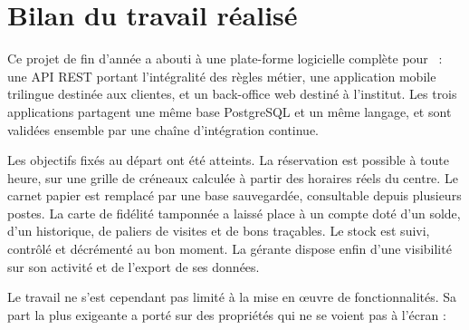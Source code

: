 
\section*{Bilan du travail réalisé}

Ce projet de fin d'année a abouti à une plate-forme logicielle complète pour
\yani\ : une API REST portant l'intégralité des règles métier, une application
mobile trilingue destinée aux clientes, et un back-office web destiné à
l'institut. Les trois applications partagent une même base PostgreSQL et un
même langage, et sont validées ensemble par une chaîne d'intégration continue.

Les objectifs fixés au départ ont été atteints. La réservation est possible à
toute heure, sur une grille de créneaux calculée à partir des horaires réels du
centre. Le carnet papier est remplacé par une base sauvegardée, consultable
depuis plusieurs postes. La carte de fidélité tamponnée a laissé place à un
compte doté d'un solde, d'un historique, de paliers de visites et de bons
traçables. Le stock est suivi, contrôlé et décrémenté au bon moment. La gérante
dispose enfin d'une visibilité sur son activité et de l'export de ses données.

Le travail ne s'est cependant pas limité à la mise en \oe uvre de
fonctionnalités. Sa part la plus exigeante a porté sur des propriétés qui ne se
voient pas à l'écran :

